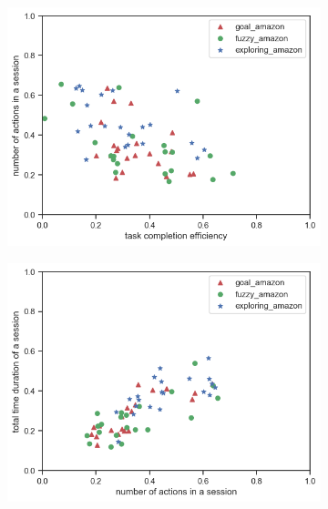 \begin{figure}
\begin{subfigure}[b]{0.45\textwidth}
        \caption{}
        \label{fig:2d-eff-dur-amazon}
    \end{subfigure}
    \begin{subfigure}[b]{0.45\textwidth}
        \includegraphics[width=1\textwidth]{figures/2d-eff-len-amazon}
        \caption{}
        \label{fig:2d-eff-len-amazon}
    \end{subfigure}
    \begin{subfigure}[b]{0.45\textwidth}
        \includegraphics[width=1\textwidth]{figures/2d-len-dur-amazon}
        \caption{}
        \label{fig:2d-len-dur-amazon}
    \end{subfigure}


\end{figure}
